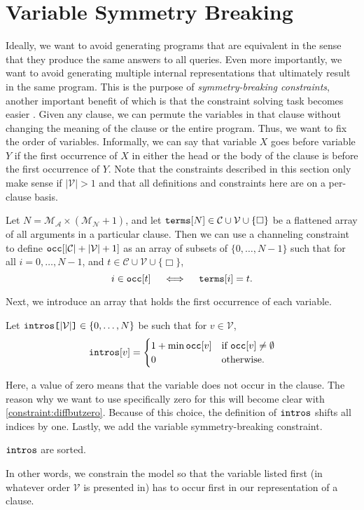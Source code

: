 \documentclass[runningheads]{llncs}
\newcommand{\variable}[1]{\texttt{\textup{#1}}}
\newcommand{\arrayd}[3]{\variable{{#1}[}{#2}\variable{]} \in {#3}}
\newcommand{\variables}{\mathcal{V}}
\newcommand{\constants}{\mathcal{C}}
\newcommand{\maxArity}{\mathcal{M}_{\mathcal{A}}}
\newcommand{\maxNumNodes}{\mathcal{M}_{\mathcal{N}}}
\begin{document}
\section{Variable Symmetry Breaking} \label{sec:variable_symmetry}

Ideally, we want to avoid generating programs that are equivalent in the sense
that they produce the same answers to all queries. Even more importantly, we
want to avoid generating multiple internal representations that ultimately
result in the same program. This is the purpose of \emph{symmetry-breaking
  constraints}, another important benefit of which is that the constraint
solving task becomes easier \cite{DBLP:conf/cp/Walsh06}. Given any clause, we
can permute the variables in that clause without changing the meaning of the
clause or the entire program. Thus, we want to fix the order of variables.
Informally, we can say that variable $X$ goes before variable $Y$ if the first
occurrence of $X$ in either the head or the body of the clause is before the
first occurrence of $Y$. Note that the constraints described in this section
only make sense if $|\variables{}| > 1$ and that all definitions and constraints
here are on a per-clause basis.
\begin{definition}
  Let $N = \maxArity{} \times (\maxNumNodes{} + 1)$, and let
  $\variable{terms}[N] \in \constants{} \cup \variables{} \cup \{ \Box
  \}$ be a flattened array of all arguments in a particular clause. Then we can
  use a channeling constraint to define $\variable{occ}[|\constants{}| +
  |\variables{}| + 1]$ as an array of subsets of $\{ 0, \dots, N-1 \}$ such that
  for all $i = 0, \dots, N - 1$, and $t \in \constants{} \cup \variables{} \cup
  \{ \Box \}$,
  \[
    i \in \variable{occ}[t] \quad \iff \quad
    \variable{terms}[i] = t.
  \]
\end{definition}
Next, we introduce an array that holds the first occurrence of each variable.
\begin{definition}
  Let $\arrayd{intros}{|\variables{}|}{\{ 0, \dots, N \}}$ be such that
  for $v \in \variables{}$,
  \[
    \variable{intros}[v] = \begin{cases}
      1 + \min \variable{occ}[v] & \text{if }
      \variable{occ}[v] \ne \emptyset\\
      0 & \text{otherwise.}
    \end{cases}
  \]
\end{definition}
Here, a value of zero means that the variable does not occur in the clause. The
reason why we want to use specifically zero for this will become clear with
\cref{constraint:diffbutzero}. Because of this choice, the definition of
$\variable{intros}$ shifts all indices by one. Lastly, we add the variable
symmetry-breaking constraint.
\begin{constraint}
  $\variable{intros}$ are sorted.
\end{constraint}
In other words, we constrain the model so that the variable listed first (in
whatever order $\variables{}$ is presented in) has to occur first in our
representation of a clause.
\end{document}
